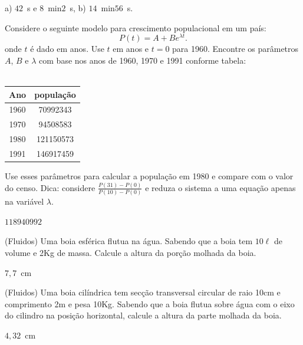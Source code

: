 \begin{resp}
  
a) $42$~s e $8$~min$2$~s, b) $14$~min$56$~s.    
  
\end{resp}


\begin{exer}\label{pop} Considere o seguinte modelo para crescimento populacional em um país:
$$P(t)=A+Be^{\lambda t}.$$
onde $t$ é dado em anos. Use $t$ em anos e $t=0$ para 1960. Encontre os parâmetros $A$, $B$ e $\lambda$ com base nos anos de 1960, 1970 e 1991 conforme tabela:\\~

\begin{tabular}{|c|c|}
\hline
Ano & população\\
\hline
1960&70992343\\
1970&94508583\\
1980&121150573\\
1991&146917459\\
\hline	
\end{tabular}

Use esses parâmetros para calcular a população em 1980 e compare com o valor do censo. Dica: considere $\frac{P(31)-P(0)}{P(10)-P(0)}$ e reduza o sistema a uma equação apenas na variável $\lambda$.
\end{exer}
\begin{resp}
  
$118940992$
  
\end{resp}

\begin{exer}(Fluidos) \label{boiaesf} Uma boia esférica flutua na água. Sabendo que a boia tem $10\ell$ de volume e 2Kg de massa. Calcule a altura da porção molhada da boia.
\end{exer}
\begin{resp}
  
$7,7$~cm    
  
\end{resp}

\begin{exer}(Fluidos) \label{boiacil} Uma boia cilíndrica tem secção transversal circular de raio 10cm e comprimento 2m e pesa 10Kg. Sabendo que a boia flutua sobre água com o eixo do cilindro na posição horizontal, calcule a altura da parte molhada da boia.
\end{exer}
\begin{resp}
  
$4,32$~cm    
  
\end{resp}

